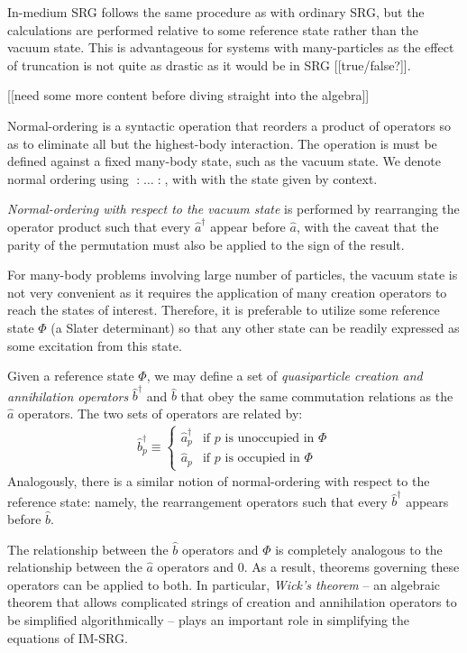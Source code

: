 \documentclass[amsmath, amssymb, aps, floatfix, nofootinbib, preprintnumbers,showpacs, superscriptaddress, twocolumn]{revtex4-1}
\begin{document}
In-medium SRG follows the same procedure as with ordinary SRG, but the
calculations are performed relative to some reference state rather than the
vacuum state.  This is advantageous for systems with many-particles as the
effect of truncation is not quite as drastic as it would be in SRG
[[true/false?]].

[[need some more content before diving straight into the algebra]]

Normal-ordering is a syntactic operation that reorders a product of operators
so as to eliminate all but the highest-body interaction.  The operation is
must be defined against a fixed many-body state, such as the vacuum state.  We
denote normal ordering using $\mathopen: \ldots \mathclose:$, with with the
state given by context.

\textit{Normal-ordering with respect to the vacuum state} is performed by
rearranging the operator product such that every $\hat a^\dagger$ appear
before $\hat a$, with the caveat that the parity of the permutation must also
be applied to the sign of the result.

For many-body problems involving large number of particles, the vacuum state
is not very convenient as it requires the application of many creation
operators to reach the states of interest.  Therefore, it is preferable to
utilize some reference state $\Phi$ (a Slater determinant) so that any other
state can be readily expressed as some excitation from this state.

Given a reference state $\Phi$, we may define a set of \textit{quasiparticle
  creation and annihilation operators} $\hat b^\dagger$ and $\hat b$ that obey
the same commutation relations as the $\hat a$ operators.  The two sets of
operators are related by:
\begin{align*}
  \hat b_p^\dagger \equiv \begin{cases}
    \hat a_p^\dagger & \text{if $p$ is unoccupied in $\Phi$} \\
    \hat a_p^{} & \text{if $p$ is occupied in $\Phi$}
  \end{cases}
\end{align*}
Analogously, there is a similar notion of normal-ordering with respect to the
reference state: namely, the rearrangement operators such that every
$\hat b^\dagger$ appears before $\hat b$.

The relationship between the $\hat b$ operators and $\Phi$ is completely
analogous to the relationship between the $\hat a$ operators and $0$.  As a
result, theorems governing these operators can be applied to both.  In
particular, \textit{Wick's theorem} -- an algebraic theorem that allows
complicated strings of creation and annihilation operators to be simplified
algorithmically -- plays an important role in simplifying the equations of
IM-SRG.
\end{document}
